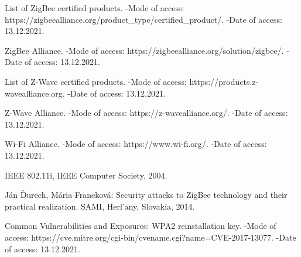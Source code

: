 \newpage
 	
	 \begin{thebibliography}{1}
	 	
	 	 List of ZigBee certified products. -Mode of access: 
	 	\newline https://zigbeealliance.org/product\_type/certified\_product/. -Date of access: 13.12.2021.
	 	
	 	 ZigBee Alliance. -Mode of access: 
	 	\newline https://zigbeealliance.org/solution/zigbee/. -Date of access: 13.12.2021.
	 	
	 	 List of Z-Wave certified products. -Mode of access: 
	 	\newline https://products.z-wavealliance.org. -Date of access: 13.12.2021.
	 	
	 	 Z-Wave Alliance. -Mode of access: 
	 	\newline https://z-wavealliance.org/. -Date of access: 13.12.2021.
	 	
	 	 Wi-Fi Alliance. -Mode of access: 
	 	\newline https://www.wi-fi.org/. -Date of access: 13.12.2021.
	 	
	 	 IEEE 802.11i, IEEE Computer Society, 2004.
	 	
	 	 Ján Ďurech, Mária Franeková: Security attacks to ZigBee technology and their practical realization. 
	 	SAMI,  Herl’any, Slovakia, 2014.
	 	
	 	 Common Vulnerabilities and Exposures: WPA2 reinstallation key. -Mode of access: 
	    https://cve.mitre.org/cgi-bin/cvename.cgi?name=CVE-2017-13077.  \newline -Date of access: 13.12.2021.
	 	
	 \end{thebibliography}